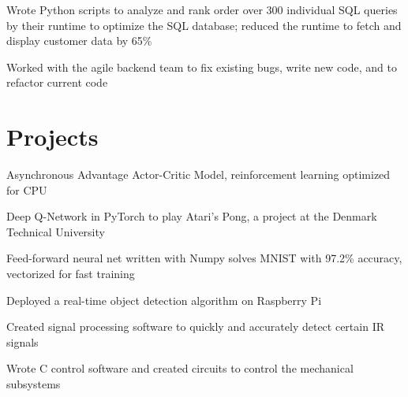 \documentclass[]{deedy-resume-openfont}
\begin{document}
\vspace{8pt}

\begin{tightemize}
    \item Wrote Python scripts to analyze and rank order over 300 individual SQL queries by their runtime to optimize the SQL database; reduced the runtime to fetch and display customer data by 65\%
    \item Worked with the agile backend team to fix existing bugs, write new code, and to refactor current code
\end{tightemize}

\vspace{12pt}


\section{Projects}

\begin{tightemize}
    \item Asynchronous Advantage Actor-Critic Model, reinforcement learning optimized for CPU
    \item Deep Q-Network in PyTorch to play Atari's Pong, a project at the Denmark Technical University
    \item Feed-forward neural net written with Numpy solves MNIST with 97.2\% accuracy, vectorized for fast training
\end{tightemize}

\vspace{8pt}

\begin{tightemize}
    \item Deployed a real-time object detection algorithm on Raspberry Pi
    \item Created signal processing software to quickly and accurately detect certain IR signals
    \item Wrote C control software and created circuits to control the mechanical subsystems
\end{tightemize}

\vspace{12pt}
\end{document}
